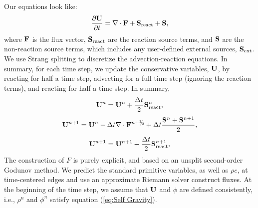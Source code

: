 Our equations look like:
\begin{equation}
\frac{\partial{\bf U}}{\partial t} = \nabla\cdot{\bf F} + {\bf S}_{\rm react} + {\bf S},
\end{equation}
where ${\bf F}$ is the flux vector, ${\bf S}_{\rm react}$ are the reaction
source terms, and ${\bf S}$ are the non-reaction source terms, which
includes any user-defined external sources, ${\bf S}_{\rm ext}$.  We use
Strang splitting to discretize the advection-reaction equations.  In
summary, for each time step, we update the conservative variables,
${\bf U}$, by reacting for half a time step, advecting for a full time
step (ignoring the reaction terms), and reacting for half a time step.
In summary,
\begin{equation}
{\bf U}^n = {\bf U}^n + \frac{\Delta t}{2}{\bf S}_{\rm react}^n,
\end{equation}
\begin{equation}
\Ub^{n+1} = \Ub^n - \Delta t \nabla \cdot\Fb^\nph + \dt\frac{\Sb^n + \Sb^{n+1}}{2},
\end{equation}
\begin{equation}
{\bf U}^{n+1} = {\bf U}^{n+1} + \frac{\Delta t}{2}{\bf S}_{\rm react}^{n+1},
\end{equation}
The construction of $F$ is purely explicit, and based on an unsplit
second-order Godunov method.  We predict the standard primitive
variables, as well as $\rho e$, at time-centered edges and use an
approximate Riemann solver construct fluxes.  At the beginning of the
time step, we assume that ${\bf U}$ and $\phi$ are defined consistently,
i.e., $\rho^n$ and $\phi^n$ satisfy equation (\ref{eq:Self
  Gravity}).\\

